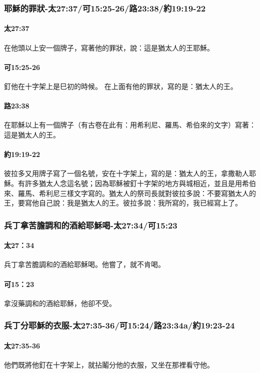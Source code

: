 \subsubsection{耶穌的罪狀-太27:37/可15:25-26/路23:38/約19:19-22}
\paragraph{太27:37}
在他頭以上安一個牌子，寫著他的罪狀，說：這是猶太人的王耶穌。
\paragraph{可15:25-26}
釘他在十字架上是巳初的時候。
在上面有他的罪狀，寫的是：猶太人的王。
\paragraph{路23:38}
在耶穌以上有一個牌子（有古卷在此有：用希利尼、羅馬、希伯來的文字）寫著：這是猶太人的王。
\paragraph{約19:19-22}
彼拉多又用牌子寫了一個名號，安在十字架上，寫的是：猶太人的王，拿撒勒人耶穌。有許多猶太人念這名號；因為耶穌被釘十字架的地方與城相近，並且是用希伯來、羅馬、希利尼三樣文字寫的。猶太人的祭司長就對彼拉多說：不要寫猶太人的王，要寫他自己說：我是猶太人的王。彼拉多說：我所寫的，我已經寫上了。

\subsubsection{兵丁拿苦膽調和的酒給耶穌喝-太27:34/可15:23}
\paragraph{太27：34}
兵丁拿苦膽調和的酒給耶穌喝。他嘗了，就不肯喝。
\paragraph{可15：23}
拿沒藥調和的酒給耶穌，他卻不受。

\subsubsection{兵丁分耶穌的衣服-太27:35-36/可15:24/路23:34a/約19:23-24}
\paragraph{太27:35-36}
他們既將他釘在十字架上，就拈鬮分他的衣服，又坐在那裡看守他。
